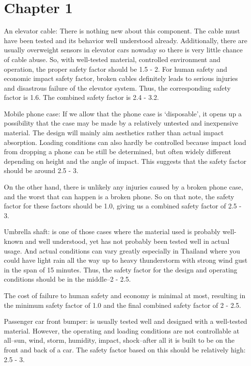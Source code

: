 \documentclass[
10pt,
a4paper,
openany,
svgnames,
]{book}
\begin{document}
\section{Chapter 1}

\begin{exercises}
  
\item An elevator cable: There is nothing new about this component. The cable must have been tested and its behavior well understood already. Additionally, there are usually overweight sensors in elevator cars nowaday so there is very little chance of cable abuse. So, with well-tested material, controlled environment and operation, the proper safety factor should be 1.5 - 2. For human safety and economic impact safety factor, broken cables definitely leads to serious injuries and disastrous failure of the elevator system. Thus, the corresponding safety factor is 1.6. The combined safety factor is 2.4 - 3.2.
\item Mobile phone case: If we allow that the phone case is `disposable', it opens up a possibility that the case may be made by a relatively untested and inexpensive material. The design will mainly aim aesthetics rather than actual impact absorption. Loading conditions can also hardly be controlled because impact load from dropping a phone can be still be determined, but often widely different depending on height and the angle of impact. This suggests that the safety factor should be around 2.5 - 3.

  On the other hand, there is unlikely any injuries caused by a broken phone case, and the worst that can happen is a broken phone. So on that note, the safety factor for these factors should be 1.0, giving us a combined safety factor of 2.5 - 3.
\item Umbrella shaft: is one of those cases where the material used is probably well-known and well understood, yet has not probably been tested well in actual usage. And actual conditions can vary greatly especially in Thailand where you could have light rain all the way up to heavy thunderstorm with strong wind gust in the span of 15 minutes. Thus, the safety factor for the design and operating conditions should be in the middle--2 - 2.5.

  The cost of failure to human safety and economy is minimal at most, resulting in the minimum safety factor of 1.0 and the final combined safety factor of 2 - 2.5.

\item Passenger car front bumper: is usually tested well and designed with a well-tested material. However, the operating and loading conditions are not controllable at all--sun, wind, storm, humidity, impact, shock--after all it is built to be on the front and back of a car. The safety factor based on this should be relatively high: 2.5 - 3.


\end{exercises}
\end{document}
